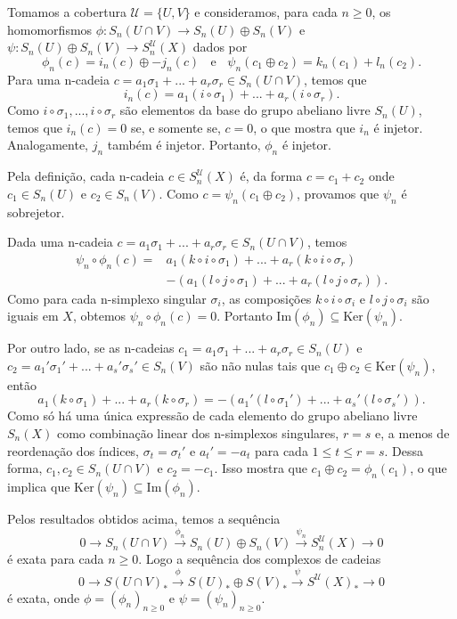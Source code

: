 \begin{dem}
    Tomamos a cobertura $\mathcal{U}=\{U,V\}$ e consideramos, para cada $n\ge 0$, os homomorfismos $\phi:S_n(U\cap V)\rightarrow S_n(U)\oplus S_n(V)$ e $\psi:S_n(U)\oplus S_n(V)\rightarrow S_n^{\mathcal{U}}(X)$ dados por 
    \[\phi_n(c)=i_n(c)\oplus -j_n(c)\;\;\text{ e }\;\;\psi_n(c_1\oplus c_2)=k_n(c_1)+l_n(c_2).\]
    Para uma n-cadeia $c=a_1\sigma_1+...+a_r\sigma_r\in S_n(U\cap V)$, temos que 
    \[i_n(c)=a_1 (i\circ \sigma_1)+...+a_r(i\circ \sigma_r).\]
    Como $i\circ\sigma_1,...,i\circ \sigma_r$ são elementos da base do grupo abeliano livre $S_n(U)$, temos que $i_n(c)=0$ se, e somente se, $c=0$, o que mostra que $i_n$ é injetor. Analogamente, $j_n$ também é injetor. Portanto, $\phi_n$ é injetor.

    Pela definição, cada n-cadeia $c\in S_n^{\mathcal{U}}(X)$ é, da forma $c=c_1+c_2$ onde $c_1\in S_n (U)$ e $c_2\in S_n(V)$. Como $c=\psi_n(c_1\oplus c_2)$, provamos que $\psi_n$ é sobrejetor.

    Dada uma n-cadeia $c=a_1\sigma_1+...+a_r\sigma_r\in S_n(U\cap V)$, temos 
    \begin{align*}
        \psi_n\circ \phi_n(c)=& a_1(k\circ i\circ \sigma_1)+...+a_r(k\circ i\circ \sigma_r)\\
        &- (a_1(l\circ j\circ \sigma_1)+...+a_r (l\circ j\circ \sigma_r)).
    \end{align*}
    Como para cada n-simplexo singular $\sigma_i$, as composições $k\circ i\circ \sigma_i$ e $l\circ j \circ \sigma_i$ são iguais em $X$, obtemos $\psi_n\circ\phi_n(c)=0$. Portanto $\text{Im}(\phi_n)\subseteq \text{Ker}(\psi_n)$.

    Por outro lado, se as n-cadeias $c_1=a_1\sigma_1+...+ a_r\sigma_r \in S_n(U)$ e $c_2=a_1'\sigma_1'+...+a_s' \sigma_s'\in S_n(V)$ são não nulas tais que $c_1\oplus c_2\in \text{Ker}(\psi_n)$, então 
    \[a_1(k\circ \sigma_1)+...+a_r (k\circ \sigma_r)=-(a_1'(l\circ \sigma_1')+...+a_s'(l\circ \sigma_s')).\]
    Como só há uma única expressão de cada elemento do grupo abeliano livre $S_n(X)$ como combinação linear dos n-simplexos singulares, $r=s$ e, a menos de reordenação dos índices, $\sigma_t=\sigma_{t}'$ e $a_t'=-a_t$ para cada $1\le t\le r=s$. Dessa forma, $c_1,c_2\in S_n(U\cap V)$ e $c_2=-c_1$. Isso mostra que $c_1\oplus c_2=\phi_n (c_1)$, o que implica que $\text{Ker}(\psi_n)\subseteq \text{Im}(\phi_n)$.

    Pelos resultados obtidos acima, temos a sequência 
    \[0\rightarrow S_n (U\cap V)\xrightarrow{\phi_n} S_n (U)\oplus S_n(V)\xrightarrow{\psi_n} S_n^{\mathcal{U}}(X)\rightarrow 0\]
    é exata para cada $n\ge 0$. Logo a
    sequência dos complexos de cadeias 
    \[0\rightarrow S (U\cap V)_*\xrightarrow{\phi} S (U)_*\oplus S(V)_*\xrightarrow{\psi} S^{\mathcal{U}}(X)_*\rightarrow 0\]
    é exata, onde $\phi=(\phi_n)_{n\ge 0}$ e $\psi=(\psi_n)_{n\ge 0}$.


\end{dem}
